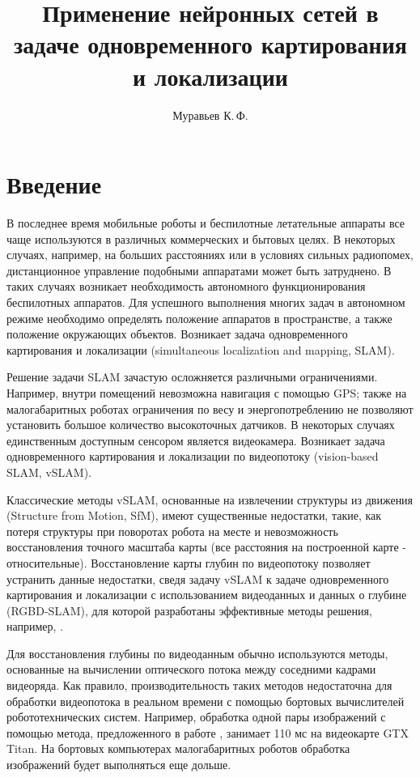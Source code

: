 \documentclass{mipt-thesis-bs}
\title{Применение нейронных сетей в задаче одновременного картирования и локализации}
\author{Муравьев К.\,Ф.}
\begin{document}
\frontmatter
\titlecontents

\mainmatter


\chapter{Введение}

В последнее время мобильные роботы и беспилотные летательные аппараты все чаще используются в различных коммерческих и бытовых целях. В некоторых случаях, например, на больших расстояниях или в условиях сильных радиопомех, дистанционное управление подобными аппаратами может быть затруднено. В таких случаях возникает необходимость автономного функционирования беспилотных аппаратов. Для успешного выполнения многих задач в автономном режиме необходимо определять положение аппаратов в пространстве, а также положение окружающих объектов. Возникает задача одновременного картирования и локализации (simultaneous localization and mapping, SLAM).

Решение задачи SLAM зачастую осложняется различными ограничениями. Например, внутри помещений невозможна навигация с помощью GPS; также на малогабаритных роботах ограничения по весу и энергопотреблению не позволяют установить большое количество высокоточных датчиков. В некоторых случаях единственным доступным сенсором является видеокамера. Возникает задача одновременного картирования и локализации по видеопотоку (vision-based SLAM, vSLAM).

Классические методы vSLAM, основанные на извлечении структуры из движения (Structure from Motion, SfM), имеют существенные недостатки, такие, как потеря структуры при поворотах робота на месте и невозможность восстановления точного масштаба карты (все расстояния на построенной карте - относительные). Восстановление карты глубин по видеопотоку позволяет устранить данные недостатки, сведя задачу vSLAM к задаче одновременного картирования и локализации с использованием видеоданных и данных о глубине (RGBD-SLAM), для которой разработаны эффективные методы решения, например, \cite{labbe2011memory}.

Для восстановления глубины по видеоданным обычно используются методы, основанные на вычислении оптического потока между соседними кадрами видеоряда. Как правило, производительность таких методов недостаточна для обработки видеопотока в реальном времени с помощью бортовых вычислителей робототехнических систем. Например, обработка одной пары изображений с помощью метода, предложенного в работе \cite{ummenhofer2017demon}, занимает 110 мс на видеокарте GTX Titan. На бортовых компьютерах малогабаритных роботов обработка изображений будет выполняться еще дольше.
\end{document}
